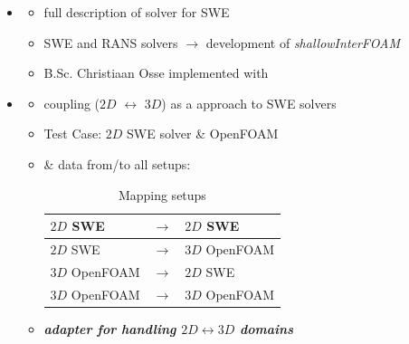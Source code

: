 \begin{frame}

\begin{multicols}{2}
\begin{itemize}
\item<2->[]
 \vspace{3em}
 \begin{itemize}
  \setlength\itemsep{2em}
  \item  full description of   solver for  SWE \cite{mintgen}
 \item  {} SWE and  RANS solvers $\rightarrow$ development of \textit{shallowInterFOAM} \cite{mintgen}
 \item B.Sc. Christiaan Osse implemented \cite{mintgen} with 
 \end{itemize}

\vfill\columnbreak

\item<3->[]
\vspace{3em}
 \begin{itemize}

 \item<4->  \cite{mintgen} coupling ($2D$ $\leftrightarrow$ $3D$) as a  approach to SWE solvers\\[2em]
 \item<5-> Test Case: $2D$ SWE solver \& OpenFOAM\\[2em]
 \item<6->  \&  data from/to all setups: \vspace{0.4cm}
\begin{table}[]
\begin{tabular}{|lll|}\hline
$2D$ SWE       & $\rightarrow$ & $2D$ SWE       \\ \hline
$2D$ SWE       & $\rightarrow$ & $3D$ OpenFOAM \\ \hline
$3D$ OpenFOAM & $\rightarrow$ & $2D$ SWE       \\ \hline
$3D$ OpenFOAM & $\rightarrow$ & $3D$ OpenFOAM \\ \hline
\end{tabular}
\caption{Mapping setups}
\label{table:1}
\end{table}
\item<7-> \textbf{\textit{ adapter for handling $2D\leftrightarrow3D$ domains}}
\end{itemize}
\end{itemize}
\end{multicols}


\end{frame}


